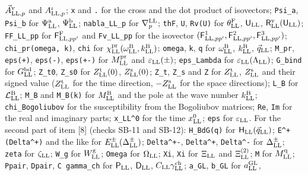 \documentclass[
  10pt,
]{article}
\begin{document}
\(\vec A^{\rm v}_{{\rm LL},p}\) and \(A^\iota_{{\rm LL},p}\); \texttt{x}
and \texttt{.} for the cross and the dot product of isovectors;
\texttt{Psi\_a}, \texttt{Psi\_b} for \(\Psi^{\rm a}_{\rm LL}\),
\(\Psi^{\rm b}_{\rm LL}\); \texttt{nabla\_LL\_p} for
\(\nabla^{\rm LL}_p\); \texttt{thF}, \texttt{U}, \texttt{Rv(U)} for
\(\theta^{\rm F}_{\rm LL}\), \(\mathsf U_{\rm LL}\),
\(\mathsf R^{\rm v}_{\rm LL}(\mathsf U_{\rm LL})\);
\texttt{FF\_LL\_pp\textquotesingle{}} for
\(\mathsf F^{\rm F}_{{\rm LL},pp'}\) and
\texttt{Fv\_LL\_pp\textquotesingle{}} for the isovector
\((\mathsf F^1_{{\rm LL},pp'},\mathsf F^2_{{\rm LL},pp'},\mathsf F^3_{{\rm LL},pp'})\);
\texttt{chi\_pr(omega,\ k)}, \texttt{chi} for
\(\chi^{\rm pr}_{\rm LL}(\omega^{\rm B}_{\rm LL},k^{\rm B}_{\rm LL})\);
\texttt{omega}, \texttt{k}, \texttt{q} for \(\omega^{\rm B}_{\rm LL}\),
\(k^{\rm B}_{\rm LL}\), \(\vec q_{\rm LL}\); \texttt{M\_pr},
\texttt{eps(+)}, \texttt{eps(-)}, \texttt{eps(+-)} for
\(M^{\rm pr}_{\rm LL}\) and \(\varepsilon_{\rm LL}(\pm)\);
\texttt{eps\_Lambda} for \(\varepsilon_{\rm LL}(\Lambda_{\rm LL})\);
\texttt{G\_bind} for \(G^{\rm bd}_{\rm LL}\); \texttt{Z\_t0},
\texttt{Z\_s0} for \(Z^{\rm t}_{\rm LL}(0)\), \(Z^{\rm s}_{\rm LL}(0)\);
\texttt{Z\_t}, \texttt{Z\_s} and \texttt{Z} for \(Z^{\rm t}_{\rm LL}\),
\(Z^{\rm s}_{\rm LL}\) and their signed value (\(Z^{\rm t}_{\rm LL}\)
for the time direction, \(-Z^{\rm s}_{\rm LL}\) for the space
directions); \texttt{L\_B} for \(\mathcal L^{\rm B}_{\rm LL}\);
\texttt{M\_B} and \texttt{M\_B(k)} for \(M^{\rm B}_{\rm LL}\) and the
pole at the wave number \(k^{\rm B}_{\rm LL}\); \texttt{chi\_Bogoliubov}
for the susceptibility from the Bogoliubov matrices; \texttt{Re},
\texttt{Im} for the real and imaginary parts; \texttt{x\_LL\^{}0} for
the time \(x^0_{\rm LL}\); \texttt{eps} for \(\varepsilon_{\rm LL}\).
For the second part of item {[}8{]} (checks SB-11 and SB-12):
\texttt{H\_BdG(q)} for \(\mathsf H_{\rm LL}(\vec q_{\rm LL})\);
\texttt{E\^{}+(Delta\^{}+)} and the like for
\(E^\pm_{\rm LL}(\Delta^\pm_{\rm LL})\); \texttt{Delta\^{}+-},
\texttt{Delta\^{}+}, \texttt{Delta\^{}-} for \(\Delta^\pm_{\rm LL}\);
\texttt{zeta} for \(\zeta_{\rm LL}\); \texttt{W\_g} for
\(W^{\rm g}_{\rm LL}\); \texttt{Omega} for \(\Omega_{\rm LL}\);
\texttt{Xi}, \texttt{Xi\textquotesingle{}\textquotesingle{}} for
\(\Xi_{\rm LL}\) and \(\Xi^{(2)}_{\rm LL}\); \texttt{M} for
\(M^{\rm q}_{\rm LL}\); \texttt{Ppair}, \texttt{Dpair},
\texttt{C\ gamma\_ch} for \(\mathsf P_{\rm LL}\),
\(\mathsf D_{\rm LL}\), \(C_{\rm LL}\gamma^{\rm ch}_{\rm LL}\);
\texttt{a\_GL}, \texttt{b\_GL} for \(a^{\rm GL}_{\rm LL}\),
\end{document}
